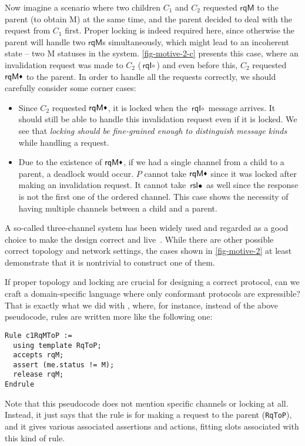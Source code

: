 \documentclass[sigplan,10pt,review,anonymous,screen]{acmart}\settopmatter{printfolios=true,printccs=false,printacmref=false}
\def\slstinline{\lstinline[basicstyle=\ttfamily\small]}
\begin{document}
Now imagine a scenario where two children $C_1$ and $C_2$ requested $\textsf{rqM}$ to the parent (to obtain M) at the same time, and the parent decided to deal with the request from $C_1$ first.
Proper locking is indeed required here, since otherwise the parent will handle two $\textsf{rqM}$s simultaneously, which might lead to an incoherent state -- two M statuses in the system.
\autoref{fig-motive-2-c} presents this case, where an invalidation request was made to $C_2$ ($\textsf{rqI}\circ$) and even before this, $C_2$ requested $\textsf{rqM}\blackdiamond$ to the parent.
In order to handle all the requests correctly, we should carefully consider some corner cases:
\begin{itemize}
\item Since $C_2$ requested $\textsf{rqM}\blackdiamond$, it is locked when the $\textsf{rqI}\circ$ message arrives. It should still be able to handle this invalidation request even if it is locked. We see that \emph{locking should be fine-grained enough to distinguish message kinds} while handling a request.
\item Due to the existence of $\textsf{rqM}\blackdiamond$, if we had a single channel from a child to a parent, a deadlock would occur. $P$ cannot take $\textsf{rqM}\blackdiamond$ since it was locked after making an invalidation request. It cannot take $\textsf{rsI}\bullet$ as well since the response is not the first one of the ordered channel. This case shows the necessity of having multiple channels between a child and a parent.
\end{itemize}

A so-called three-channel system has been widely used and regarded as a good choice to make the design correct and live~\cite{Murali:2015,thesis:Murali:2016}.
While there are other possible correct topology and network settings, the cases shown in \autoref{fig-motive-2} at least demonstrate that it is nontrivial to construct one of them.


If proper topology and locking are crucial for designing a correct protocol, can we craft a domain-specific language where only conformant protocols are expressible?
That is exactly what we did with \hemiola{}, where, for instance, instead of the above pseudocode, rules are written more like the following one:
\begin{lstlisting}
Rule c1RqMToP :=
  using template RqToP;
  accepts rqM;
  assert (me.status != M);
  release rqM;
Endrule
\end{lstlisting}
Note that this pseudocode does not mention specific channels or locking at all.
Instead, it just says that the rule is for making a request to the parent (\slstinline{RqToP}), and it gives various associated assertions and actions, fitting slots associated with this kind of rule.
\end{document}
